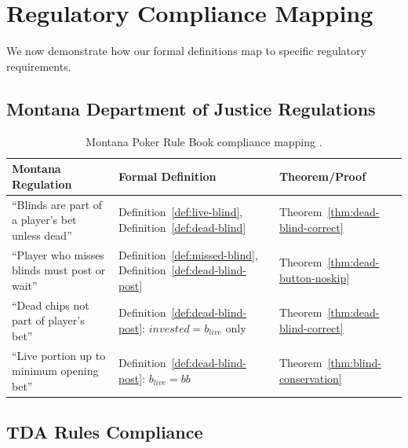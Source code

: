 \documentclass[11pt,a4paper]{article}
\begin{document}
\section{Regulatory Compliance Mapping}
\label{sec:compliance}

We now demonstrate how our formal definitions map to specific regulatory requirements.

\subsection{Montana Department of Justice Regulations}

\begin{table}[h]
\centering
\begin{tabular}{@{}p{5cm}p{5cm}p{3.5cm}@{}}
\toprule
\textbf{Montana Regulation} & \textbf{Formal Definition} & \textbf{Theorem/Proof} \\
\midrule
``Blinds are part of a player's bet unless dead'' & Definition~\ref{def:live-blind}, Definition~\ref{def:dead-blind} & Theorem~\ref{thm:dead-blind-correct} \\
\midrule
``Player who misses blinds must post or wait'' & Definition~\ref{def:missed-blind}, Definition~\ref{def:dead-blind-post} & Theorem~\ref{thm:dead-button-noskip} \\
\midrule
``Dead chips not part of player's bet'' & Definition~\ref{def:dead-blind-post}: $invested = b_{live}$ only & Theorem~\ref{thm:dead-blind-correct} \\
\midrule
``Live portion up to minimum opening bet'' & Definition~\ref{def:dead-blind-post}: $b_{live} = bb$ & Theorem~\ref{thm:blind-conservation} \\
\bottomrule
\end{tabular}
\caption{Montana Poker Rule Book compliance mapping \cite{montana2014poker}.}
\label{tab:montana-compliance}
\end{table}

\subsection{TDA Rules Compliance}
\end{document}

